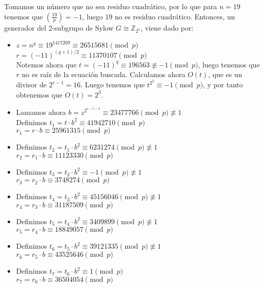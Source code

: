\documentclass[fleqn]{article}
\def\Z{\mathds{Z}}
\begin{document}
    Tomamos un número que no sea residuo cuadrático, por lo que para $n=19$ tenemos que $\left(\frac{19}{p}\right) = -1$, luego 19 no es residuo cuadrático.
    Entonces, un generador del 2-subgrupo de Sylow $ G \cong \Z_{2^{5}}$, viene dado por:
    \begin{itemize}
        \item   $z = n^q \equiv 19^{1417269} \equiv 26515681 \pmod{p}$\\
                $r = (-11)^{(q+1)/2} \equiv 11370107 \pmod{p}$\\
                Notemos ahora que $t = (-11)^q \equiv 196563 \not\equiv -1 \pmod{p}$, luego tenemos que $r$ no es raíz de la ecuación buscada.
                Calculamos ahora $O(t)$, que es un divisor de $2^{e-1}=16$. Luego tenemos que $t^{2^2} \equiv -1 \pmod{p} $, y por tanto
                obtenemos que $O(t) = 2^3$.
        \item   Lamamos ahora $b = z^{2^{e-i-1}} \equiv 23477766 \pmod{p} \not\equiv 1$ \\
                Definimos $t_1 = t \cdot b^2 \equiv 41942710 \pmod{p}$\\
                $r_1 = r \cdot b \equiv 25961315 \pmod{p}$\\
        \item   Definimos $t_2 = t_1 \cdot b^2 \equiv 6231274 \pmod{p} \not\equiv 1$\\
                $r_2 = r_1 \cdot b \equiv 11123330 \pmod{p}$\\
        \item   Definimos $t_3 = t_2 \cdot b^2 \equiv -1 \pmod{p} \not\equiv 1$\\
                $r_3 = r_2 \cdot b \equiv 3748274 \pmod{p}$\\
        \item   Definimos $t_4 = t_3 \cdot b^2 \equiv 45156046 \pmod{p} \not\equiv 1$\\
                $r_4 = r_3 \cdot b \equiv 31187509 \pmod{p}$\\
        \item   Definimos $t_5 = t_4 \cdot b^2 \equiv 3409899 \pmod{p} \not\equiv 1$\\
                $r_5 = r_4 \cdot b \equiv 18849057 \pmod{p}$\\
        \item   Definimos $t_6 = t_5 \cdot b^2 \equiv 39121335 \pmod{p} \not\equiv 1$\\
                $r_6 = r_5 \cdot b \equiv 43525646 \pmod{p}$\\
        \item   Definimos $t_7 = t_6 \cdot b^2 \equiv 1 \pmod{p}$\\
                $r_7 = r_6 \cdot b \equiv 36504054 \pmod{p}$\\
    \end{itemize}
\end{document}

